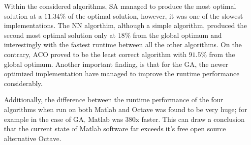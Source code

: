 \documentclass[twocolumn]{article}
\begin{document}
	Within the considered algorithms, SA managed to produce the most optimal solution at a $11.34\%$ of the optimal solution, however, it was one of the slowest implementations. The NN algorthim, although a simple algorithm, produced the second most optimal solution only at $18\%$ from the global optimum and interestingly with the fastest runtime between all the other algorithms. On the contrary, ACO proved to be the least correct algorithm with $91.5\%$ from the global optimum. Another important finding, is that for the GA, the newer optimized implementation have managed to improve the runtime performance considerably.
	
	Additionally, the difference between the runtime performance of the four algorithms when run on both {Matlab\texttrademark} and Octave was found to be very huge; for example in the case of GA, {Matlab\texttrademark} was 380x faster. This can draw a conclusion that the current state of {Matlab\texttrademark} software far exceeds it's free open source alternative Octave.
\end{document}
